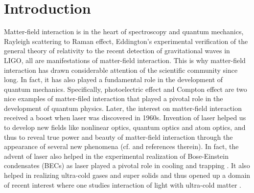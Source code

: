 \documentclass[epj]{svjour}
\begin{document}
\section{Introduction}
Matter-field interaction is in the heart of spectroscopy and quantum mechanics, Rayleigh scattering to Raman effect, Eddington's experimental verification of the general theory of relativity to the recent detection of gravitational waves in LIGO, all are manifestations of matter-field interaction. This is why  matter-field interaction has drawn considerable attention of the scientific community since long. In fact, it has also played a fundamental role in the development of quantum mechanics. Specifically, photoelectric effect and Compton effect are two nice examples of matter-filed interaction that played a pivotal role in the development of quantum physics. Later, the interest on matter-field interaction received a boost when laser was discovered in 1960s. Invention of laser helped us to develop new fields like nonlinear optics, quantum optics and atom optics, and thus to reveal true power and beauty of matter-field interaction through the appearance of several new phenomena (cf. \cite{withAKG} and references therein). In fact, the advent of laser also helped  in the experimental realization of Bose-Einstein condensates (BECs) as laser played a pivotal role in cooling and trapping \cite{MOT}. It also helped  in realizing ultra-cold gases and super solids and thus opened up a domain of recent  interest where one  studies interaction of light with ultra-cold matter \cite{ultracold1,ultracold2}.
\end{document}
